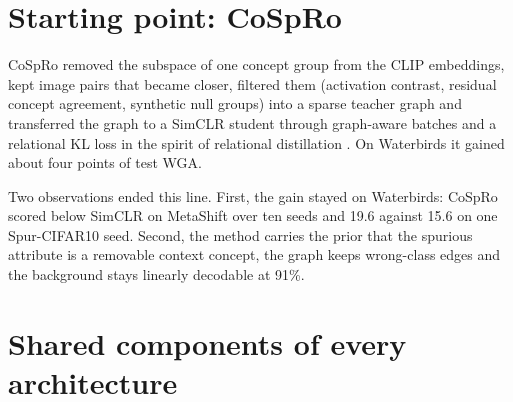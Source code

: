 \documentclass[11pt]{article}
\begin{document}
\section{Starting point: CoSpRo}
CoSpRo removed the subspace of one concept group from the CLIP embeddings, kept image pairs that became
closer, filtered them (activation contrast, residual concept agreement, synthetic null groups) into a sparse
teacher graph and transferred the graph to a SimCLR student through graph-aware batches and a relational KL
loss in the spirit of relational distillation \citep{park2019rkd}. On Waterbirds it gained about four points
of test WGA.

Two observations ended this line. First, the gain stayed on Waterbirds: CoSpRo scored below SimCLR on
MetaShift over ten seeds and 19.6 against 15.6 on one Spur-CIFAR10 seed. Second, the method carries the prior
that the spurious attribute is a removable context concept, the graph keeps wrong-class edges and the
background stays linearly decodable at 91\%.

\section{Shared components of every architecture}
\end{document}
